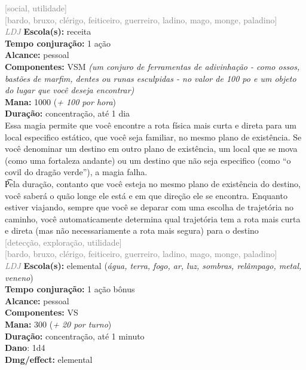 \documentclass{RPG_Adventure}[2021/10/20]
\begin{document}
{\scriptsize \textcolor{gray}{[social, utilidade]\\}}
{\scriptsize \textcolor{gray}{[bardo, bruxo, clérigo, feiticeiro, guerreiro, ladino, mago, monge, paladino]\\}}
{\tiny \textcolor{gray}{\textit{LDJ}}}
{\small \t \textbf{Escola(s):} receita\\\t \textbf{Tempo conjuração:} 1 ação\\\t \textbf{Alcance:} pessoal\\\t \textbf{Componentes:} VSM \textit{(um conjuro de ferramentas de adivinhação - como ossos, bastões de marfim, dentes ou runas esculpidas - no valor de 100 po e um objeto do lugar que você deseja encontrar)}\\\t \textbf{Mana:} 1000 (\textit{+ 100 por hora})\\\t \textbf{Duração:} concentração, até 1 dia\\}
{\normalsize Essa magia permite que você encontre a rota física mais curta e direta para um local especifico estático, que você seja familiar, no mesmo plano de existência. Se você denominar um destino em outro plano de existência, um local que se mova (como uma fortaleza andante) ou um destino que não seja especifico (como “o covil do dragão verde”), a magia falha.\\\t Pela duração, contanto que você esteja no mesmo plano de existência do destino, você saberá o quão longe ele está e em que direção ele se encontra. Enquanto estiver viajando, sempre que você se deparar com uma escolha de trajetória no caminho, você automaticamente determina qual trajetória tem a rota mais curta e direta (mas não necessariamente a rota mais segura) para o destino\\}
{\scriptsize \textcolor{gray}{[detecção, exploração, utilidade]\\}}
{\scriptsize \textcolor{gray}{[bardo, bruxo, clérigo, feiticeiro, guerreiro, ladino, mago, monge, paladino]\\}}
{\tiny \textcolor{gray}{\textit{LDJ}}}
{\small \t \textbf{Escola(s):} elemental (\textit{água, terra, fogo, ar, luz, sombras, relâmpago, metal, veneno})\\\t \textbf{Tempo conjuração:} 1 ação bônus\\\t \textbf{Alcance:} pessoal\\\t \textbf{Componentes:} VS\\\t \textbf{Mana:} 300 (\textit{+ 20 por turno})\\\t \textbf{Duração:} concentração, até 1 minuto\\\t \textbf{Dano}: 1d4\\\t \textbf{Dmg/effect:} elemental\\}
\end{document}
